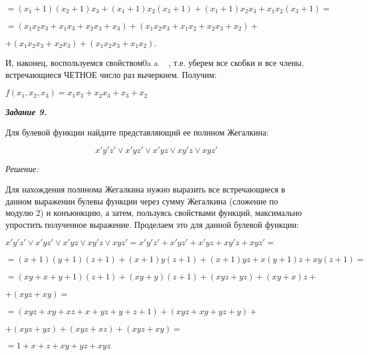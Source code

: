 \documentclass[11pt]{article}
\begin{document}
$ = (x_1 + 1)(x_2 + 1)x_3 + (x_1 + 1)x_2(x_3 + 1) + (x_1 + 1)x_2x_3 + x_1x_2(x_3 + 1) = $

$ = (x_1x_2x_3 + x_1x_3 + x_2x_3 + x_3) + (x_1x_2x_3 + x_1x_2 + x_2x_3 + x_2) + $

$ + (x_1x_2x_3 + x_2x_3) + (x_1x_2x_3 + x_1x_2).$

И, наконец, воспользуемся свойством0a a  , т.е. уберем все скобки и
все члены, встречающиеся ЧЕТНОЕ число раз вычеркнем. Получим:

$f(x_1,x_2,x_3)= x_1x_3 + x_2x_3 + x_3 + x_2$

\pagebreak

\textbf{\textit{Задание 9.}}

Для булевой функции найдите представляющий ее полином Жегалкина:

$$x'y'z' \lor x'yz' \lor x'yz \lor xy'z \lor xyz'$$

\textit{Решение:}

Для нахождения полинома Жегалкина нужно выразить все
встречающиеся в данном выражении булевы функции через сумму Жегалкина
(сложение по модулю 2) и конъюнкцию, а затем, пользуясь свойствами
функций, максимально упростить полученное выражение. Проделаем это для
данной булевой функции:

$x'y'z' \lor x'yz' \lor x'yz \lor xy'z \lor xyz' = x'y'z' + x'yz' + x'yz + xy'z + xyz' =$

$= (x+1)(y+1)(z+1) + (x+1)y(z+1)+(x+1)yz+x(y+1)z+xy(z+1)=$

$ = (xy + x + y + 1)(z+1) + (xy + y)(z+1)+(xyz+yz)+(xy+x)z+$

$ + (xyz+xy)=$

$=(xyz + xy + xz + x + yz + y + z + 1) + (xyz + xy + yz + y) + $

$ + (xyz + yz) + (xyz + xz) + (xyz + xy) =$

$ = 1 + x + z + xy + yz + xyz$
\end{document}
